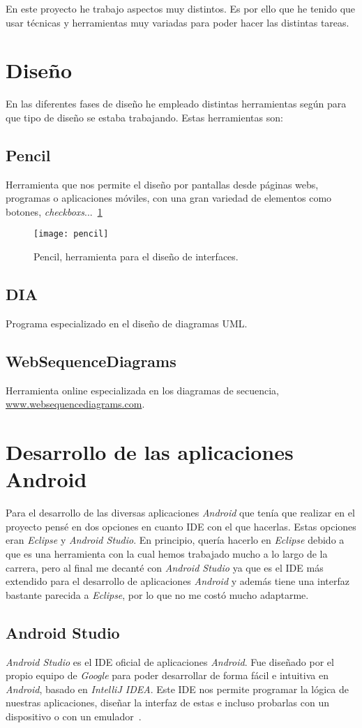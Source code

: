 
En este proyecto he trabajo aspectos muy distintos. Es por ello que he tenido que usar técnicas y herramientas muy variadas para poder hacer las distintas tareas.

\section{Diseño}
En las diferentes fases de diseño he empleado distintas herramientas según para que tipo de diseño se estaba trabajando. Estas herramientas son:
\subsection{Pencil}
Herramienta que nos permite el diseño por pantallas desde páginas webs, programas o aplicaciones móviles, con una gran variedad de elementos como botones, \textit{checkboxs}...~\ref{fig:pencil}

\begin{figure}
	\centering
	\texttt{[image: pencil]}
	\caption{Pencil, herramienta para el diseño de interfaces.}
	\label{fig:pencil}
\end{figure}
\subsection{DIA}Programa especializado en el diseño de diagramas UML.
\subsection{WebSequenceDiagrams}Herramienta online especializada en los diagramas de secuencia, \url{www.websequencediagrams.com}. 
\section{Desarrollo de las aplicaciones Android}
Para el desarrollo de las diversas aplicaciones \textit{Android} que tenía que realizar en el proyecto pensé en dos opciones en cuanto IDE con el que hacerlas. Estas opciones eran \textit{Eclipse} y \textit{Android Studio}. En principio, quería hacerlo en \textit{Eclipse} debido a que es una herramienta con la cual hemos trabajado mucho a lo largo de la carrera, pero al final me decanté con \textit{Android Studio} ya que es el IDE más extendido para el desarrollo de aplicaciones \textit{Android} y además tiene una interfaz bastante parecida a \textit{Eclipse}, por lo que no me costó mucho adaptarme.
\subsection{Android Studio}
\textit{Android Studio} es el IDE oficial de aplicaciones \textit{Android}. Fue diseñado por el propio equipo de \textit{Google} para poder desarrollar de forma fácil e intuitiva en \textit{Android}, basado en \textit{IntelliJ IDEA}. Este IDE nos permite programar la lógica de nuestras aplicaciones, diseñar la interfaz de estas e incluso probarlas con un dispositivo o con un emulador~\cite{androidstudio}.

